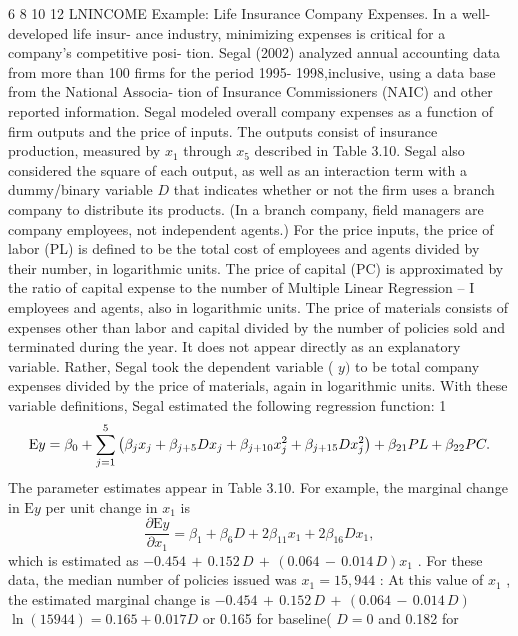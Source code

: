 \documentclass[11pt]{article}
\begin{document}
6 8 10 12
LNINCOME
Example: Life Insurance Company Expenses. In a well-developed life insur-
ance industry, minimizing expenses is critical for a company's competitive posi-
 tion. Segal (2002) analyzed annual accounting data from more than 100 firms for
the period 1995- 1998,inclusive, using a data base from the National Associa-
tion of Insurance Commissioners (NAIC) and other reported information. Segal
 modeled overall company expenses as a function of firm outputs and the price of
inputs. The outputs consist of insurance production, measured by \(x_{1}\) through \(x_{5}\)
described in Table 3.10. Segal also considered the square of each output, as well
as an interaction term with a dummy/binary variable \(\mathit{D}\) that indicates whether
or not the firm uses a branch company to distribute its products. (In a branch
company, field managers are company employees, not independent agents.)
For the price inputs, the price of labor (PL) is defined to be the total cost of
employees and agents divided by their number, in logarithmic units. The price
 of capital (PC) is approximated by the ratio of capital expense to the number of
 Multiple Linear Regression -- I
employees and agents, also in logarithmic units. The price of materials consists of
 expenses other than labor and capital divided by the number of policies sold and
 terminated during the year. It does not appear directly as an explanatory variable.
Rather, Segal took the dependent variable ( \(y )\) to be total company expenses
 divided by the price of materials, again in logarithmic units.
With these variable definitions, Segal estimated the following regression
function:
1
\[
\begin{aligned} {\textnormal{E} y=\beta_{0}+\sum_{j=1}^{5} \left( \beta_{j} x_{j}+\beta_{j+5} D x_{j}+\beta_{j+1 0} x_{j}^{2}+\beta_{j+1 5} D x_{j}^{2} \right)+\beta_{2 1} P L+\beta_{2 2} P C .} \\ \end{aligned}
\]
 The parameter estimates appear in Table 3.10. For example, the marginal change
in \(\textrm{E} y\) per unit change in \(x_{1}\) is
\[
\frac{\partial\textrm{E} y} {\partial x_{1}}=\beta_{1}+\beta_{6} D+2 \beta_{1 1} x_{1}+2 \beta_{1 6} D x_{1} ,
\]
which is estimated as \(- 0 . 4 5 4 \,+\, 0 . 1 5 2 \, D \,+\, ( 0 . 0 6 4 \,-\, 0 . 0 1 4 \, D ) x_{1}\) . For these data,
the median number of policies issued was \(x_{1}=1 5 , 9 4 4\) : At this value of
\(x_{1}\) , the estimated marginal change is \(- 0 . 4 5 4 \,+\, 0 . 1 5 2 \, D \,+\, ( 0 . 0 6 4 \,-\, 0 . 0 1 4 \, D )\)
\(\operatorname{l n} ( 1 5 9 4 4 )=0 . 1 6 5+0 . 0 1 7 D\) or 0.165 for baseline( \(D=0\) and 0.182 for
\end{document}

